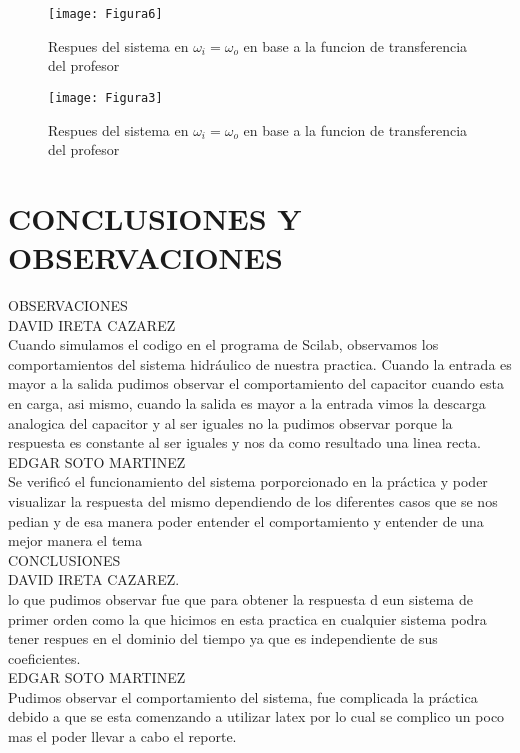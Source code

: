 \documentclass{report}
\newcounter{ns}
\begin{document}
	\begin{figure}[H]
		\centering
		\texttt{[image: Figura6]}
		\caption{Respues del sistema en $\omega_i = \omega_o$ en base a la funcion de transferencia del profesor}
		\label{fig:figura7}
	\end{figure}

	\begin{figure}[H]
		\centering
		\texttt{[image: Figura3]}
		\caption{Respues del sistema en $\omega_i = \omega_o$ en base a la funcion de transferencia del profesor}
		\label{fig:figura7}
	\end{figure}
	
	\chapter*{CONCLUSIONES Y OBSERVACIONES}

	
OBSERVACIONES\\

	DAVID IRETA CAZAREZ\\
Cuando simulamos el codigo en el programa de Scilab, observamos los comportamientos del sistema hidráulico de nuestra practica. Cuando la entrada es mayor a la salida pudimos observar el comportamiento del capacitor cuando esta en carga, asi mismo, cuando la salida es mayor a la entrada vimos la descarga analogica del capacitor y al ser iguales no la pudimos observar porque la respuesta es constante al ser iguales y nos da como resultado una linea recta.\\

	EDGAR SOTO MARTINEZ\\
Se verificó el funcionamiento del sistema porporcionado en la práctica y poder visualizar la respuesta del mismo dependiendo de los diferentes casos que se nos pedian y de esa manera poder entender el comportamiento y entender de una mejor manera el tema\\

CONCLUSIONES\\

	DAVID IRETA CAZAREZ.\\
lo que pudimos observar fue que para obtener la respuesta d eun sistema de primer orden como la que hicimos en esta practica en cualquier sistema podra tener respues en el dominio del tiempo ya que es independiente de sus coeficientes.\\ 

	EDGAR SOTO MARTINEZ\\
Pudimos observar el comportamiento del sistema, fue complicada la práctica debido a que se esta comenzando a utilizar latex por lo cual se complico un poco mas el poder llevar a cabo el reporte.
			
\end{document}
